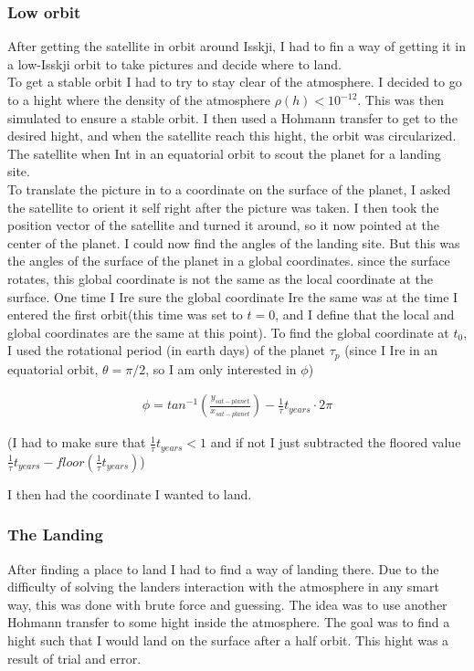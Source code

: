 \documentclass[a4paper, 10pt]{article}
\begin{document}
\subsubsection{Low orbit}
After getting the satellite in orbit around Isskji, I had to fin a way of getting it in a low-Isskji orbit to take pictures and decide where to land.\\

To get a stable orbit I had to try to stay clear of the atmosphere. I decided to go to a hight where the density of the atmosphere $\rho (h) < 10^{-12}$. This was then simulated to ensure a stable orbit. I then used a Hohmann transfer to get to the desired hight, and when the satellite reach this hight, the orbit was circularized. The satellite when Int in an equatorial orbit to scout the planet for a landing site.\\

To translate the picture in to a coordinate on the surface of the planet, I asked the satellite to orient it self right after the picture was taken. I then took the position vector of the satellite and turned it around, so it now pointed at the center of the planet. I could now find the angles of the landing site. But this was the angles of the surface of the planet in a global coordinates. since the surface rotates, this global coordinate is not the same as the local coordinate at the surface. One time I Ire sure the global coordinate Ire the same was at the time I entered the first orbit(this time was set to $t = 0$, and I define that the local and global coordinates are the same at this point). To find the global coordinate at $t_0$, I used the rotational period (in earth days) of the planet $\tau_p$ (since I Ire in an equatorial orbit, $\theta = \pi /2$, so I am only interested in $\phi$)

\begin{align}
\phi = tan^{-1}\left(\frac{y_{sat-planet}}{x_{sat-planet}} \right) - \frac{1}{\tau}t_{years}\cdot 2\pi
\end{align}

(I had to make sure that $\frac{1}{\tau}t_{years} < 1$ and if not I just subtracted the floored value $\frac{1}{\tau}t_{years} - floor(\frac{1}{\tau}t_{years})$)

I then had the coordinate I wanted to land.

\subsubsection{The Landing}
After finding a place to land I had to find a way of landing there. Due to the difficulty of solving the landers interaction with the atmosphere in any smart way, this was done with brute force and guessing. The idea was to use another Hohmann transfer to some hight inside the atmosphere. The goal was to find a hight such that I would land on the surface after a half orbit. This hight was a result of trial and error. \\
\end{document}

